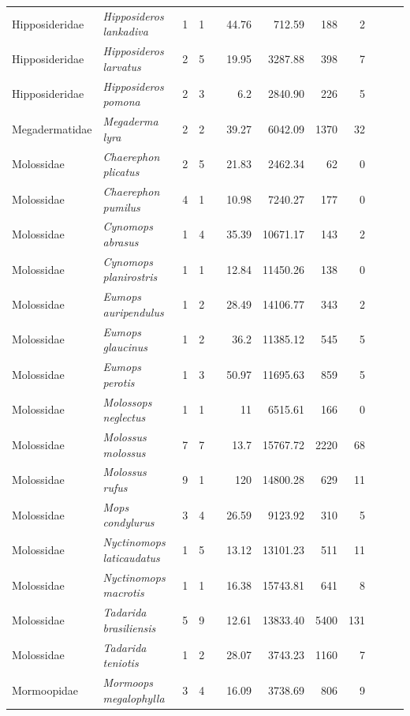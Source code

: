 \begin{landscape}
\begin{longtable}{@{}llrrrrrrrrrl@{}}
  Hipposideridae & \emph{Hipposideros lankadiva} & 1 & 1 &  & 44.76 & 712.59 & 188 & 2 &  &  &  \\ 
  Hipposideridae & \emph{Hipposideros larvatus} & 2 & 5 &  & 19.95 & 3287.88 & 398 & 7 &  &  &  \\ 
  Hipposideridae & \emph{Hipposideros pomona} & 2 & 3 &  & 6.2 & 2840.90 & 226 & 5 &  &  &  \\ 
  Megadermatidae & \emph{Megaderma lyra} & 2 & 2 &  & 39.27 & 6042.09 & 1370 & 32 &  &  &  \\ 
  Molossidae & \emph{Chaerephon plicatus} & 2 & 5 &  & 21.83 & 2462.34 & 62 & 0 &  &  &  \\ 
  Molossidae & \emph{Chaerephon pumilus} & 4 & 1 &  & 10.98 & 7240.27 & 177 & 0 &  &  &  \\ 
  Molossidae & \emph{Cynomops abrasus} & 1 & 4 &  & 35.39 & 10671.17 & 143 & 2 &  &  &  \\ 
  Molossidae & \emph{Cynomops planirostris} & 1 & 1 &  & 12.84 & 11450.26 & 138 & 0 &  &  &  \\ 
  Molossidae & \emph{Eumops auripendulus} & 1 & 2 &  & 28.49 & 14106.77 & 343 & 2 &  &  &  \\ 
  Molossidae & \emph{Eumops glaucinus} & 1 & 2 &  & 36.2 & 11385.12 & 545 & 5 &  &  &  \\ 
  Molossidae & \emph{Eumops perotis} & 1 & 3 &  & 50.97 & 11695.63 & 859 & 5 &  &  &  \\ 
  Molossidae & \emph{Molossops neglectus} & 1 & 1 &  & 11 & 6515.61 & 166 & 0 &  &  &  \\ 
  Molossidae & \emph{Molossus molossus} & 7 & 7 &  & 13.7 & 15767.72 & 2220 & 68 &  &  &  \\ 
  Molossidae & \emph{Molossus rufus} & 9 & 1 &  & 120 & 14800.28 & 629 & 11 &  &  &  \\ 
  Molossidae & \emph{Mops condylurus} & 3 & 4 &  & 26.59 & 9123.92 & 310 & 5 &  &  &  \\ 
  Molossidae & \emph{Nyctinomops laticaudatus} & 1 & 5 &  & 13.12 & 13101.23 & 511 & 11 &  &  &  \\ 
  Molossidae & \emph{Nyctinomops macrotis} & 1 & 1 &  & 16.38 & 15743.81 & 641 & 8 &  &  &  \\ 
  Molossidae & \emph{Tadarida brasiliensis} & 5 & 9 &  & 12.61 & 13833.40 & 5400 & 131 &  &  &  \\ 
  Molossidae & \emph{Tadarida teniotis} & 1 & 2 &  & 28.07 & 3743.23 & 1160 & 7 &  &  &  \\ 
  Mormoopidae & \emph{Mormoops megalophylla} & 3 & 4 &  & 16.09 & 3738.69 & 806 & 9 &  &  &  \\ 

\end{longtable}
\end{landscape}
